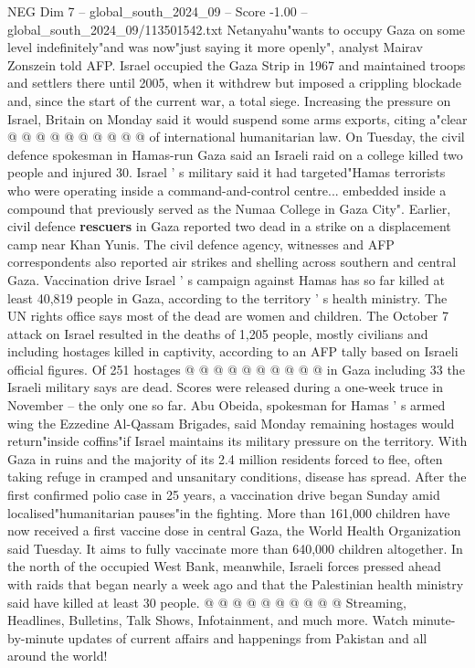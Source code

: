 \begin{textsample}{NEG Dim 7 – global\_south\_2024\_09 – Score -1.00 – global\_south\_2024\_09/113501542.txt}
Netanyahu"wants to occupy Gaza on some level indefinitely"and was now"just saying it more openly", analyst Mairav Zonszein told AFP.
Israel occupied the Gaza Strip in 1967 and maintained troops and settlers there until 2005, when it withdrew but imposed a crippling blockade and, since the start of the current war, a total siege.
Increasing the pressure on Israel, Britain on Monday said it would suspend some arms exports, citing a"clear @ @ @ @ @ @ @ @ @ @ of international humanitarian law.
On Tuesday, the civil defence spokesman in Hamas-run Gaza said an Israeli raid on a college killed two people and injured 30.
Israel ' s military said it had targeted"Hamas terrorists who were operating inside a command-and-control centre... embedded inside a compound that previously served as the Numaa College in Gaza City".
Earlier, civil defence \textbf{rescuers} in Gaza reported two dead in a strike on a displacement camp near Khan Yunis.
The civil defence agency, witnesses and AFP correspondents also reported air strikes and shelling across southern and central Gaza.
Vaccination drive Israel ' s campaign against Hamas has so far killed at least 40,819 people in Gaza, according to the territory ' s health ministry.
The UN rights office says most of the dead are women and children.
The October 7 attack on Israel resulted in the deaths of 1,205 people, mostly civilians and including hostages killed in captivity, according to an AFP tally based on Israeli official figures.
Of 251 hostages @ @ @ @ @ @ @ @ @ @ in Gaza including 33 the Israeli military says are dead.
Scores were released during a one-week truce in November -- the only one so far.
Abu Obeida, spokesman for Hamas ' s armed wing the Ezzedine Al-Qassam Brigades, said Monday remaining hostages would return"inside coffins"if Israel maintains its military pressure on the territory.
With Gaza in ruins and the majority of its 2.4 million residents forced to flee, often taking refuge in cramped and unsanitary conditions, disease has spread.
After the first confirmed polio case in 25 years, a vaccination drive began Sunday amid localised"humanitarian pauses"in the fighting.
More than 161,000 children have now received a first vaccine dose in central Gaza, the World Health Organization said Tuesday.
It aims to fully vaccinate more than 640,000 children altogether.
In the north of the occupied West Bank, meanwhile, Israeli forces pressed ahead with raids that began nearly a week ago and that the Palestinian health ministry said have killed at least 30 people. @ @ @ @ @ @ @ @ @ @ Streaming, Headlines, Bulletins, Talk Shows, Infotainment, and much more.
Watch minute-by-minute updates of current affairs and happenings from Pakistan and all around the world!

\end{textsample}
